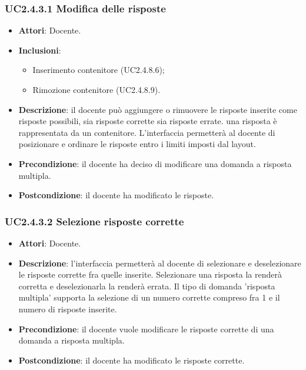 \subsubsection{UC2.4.3.1 Modifica delle risposte}
\begin{itemize}
\item \textbf{Attori}: Docente.
\item \textbf{Inclusioni}:
\begin{itemize}
\item Inserimento contenitore (UC2.4.8.6);
\item Rimozione contenitore (UC2.4.8.9).
\end{itemize}
\item \textbf{Descrizione}: il docente può aggiungere o rimuovere le risposte inserite come risposte possibili, sia risposte corrette sia risposte errate. una risposta è rappresentata da un contenitore. L'interfaccia permetterà al docente di posizionare e ordinare le risposte entro i limiti imposti dal layout.
\item \textbf{Precondizione}: il docente ha deciso di modificare una domanda a risposta multipla.
\item \textbf{Postcondizione}: il docente ha modificato le risposte.
\end{itemize}
\subsubsection{UC2.4.3.2 Selezione risposte corrette}
\begin{itemize}
\item \textbf{Attori}: Docente.
\item \textbf{Descrizione}: l'interfaccia permetterà al docente di selezionare e deselezionare le risposte corrette fra quelle inserite. Selezionare una risposta la renderà corretta e deselezionarla la renderà errata. Il tipo di domanda 'risposta multipla' supporta la selezione di un numero corrette compreso fra 1 e il numero di risposte inserite.
\item \textbf{Precondizione}: il docente vuole modificare le risposte corrette di una domanda a risposta multipla.
\item \textbf{Postcondizione}: il docente ha modificato le risposte corrette.
\end{itemize}
